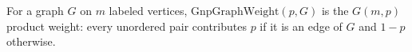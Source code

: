 \begin{definition}
For a graph \(G\) on \(m\) labeled vertices, \(\mathrm{GnpGraphWeight}(p,G)\)
is the \(G(m,p)\) product weight: every unordered pair contributes \(p\) if it
is an edge of \(G\) and \(1-p\) otherwise.
\end{definition}
